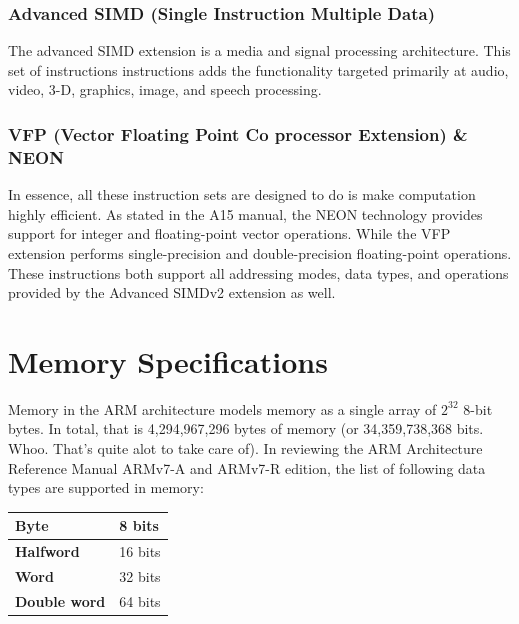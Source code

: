 \documentclass[12pt]{scrreprt}
\begin{document}
		\subsection{Advanced SIMD (Single Instruction Multiple Data)}
			The advanced SIMD extension is a media and signal processing architecture.
			This set of instructions instructions adds the functionality targeted primarily at audio, video, 3-D, graphics, image, and speech processing.
		
		\subsection{VFP (Vector Floating Point Co processor Extension) \& NEON}
			In essence, all these instruction sets are designed to do is make computation highly efficient.
			As stated in the A15 manual, the NEON technology provides support for integer and floating-point vector operations.
			While the VFP extension performs single-precision and double-precision floating-point operations.
			These instructions both support all addressing modes, data types, and operations provided by the Advanced SIMDv2 extension as well.

{\let\clearpage\relax\chapter{Memory Specifications}}

	Memory in the ARM architecture models memory as a single array of $2^{32}$ 8-bit bytes.
	In total, that is 4,294,967,296 bytes of memory (or 34,359,738,368 bits. Whoo. That's quite alot to take care of). In reviewing the ARM Architecture Reference Manual ARMv7-A and ARMv7-R edition, the list of following data types are supported in memory:


	\begin{center}
		\begin{tabular}{|l|l|}
		\hline
			\bfseries Byte & 8 bits \\ \hline
			\bfseries Halfword & 16 bits \\ \hline
			\bfseries Word & 32 bits \\ \hline
			\bfseries Double word & 64 bits \\ \hline
		\end{tabular}
	\end{center}
\end{document}
